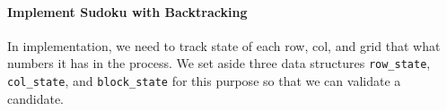 \documentclass[../main.tex]{subfiles}
\begin{document}
\paragraph{Implement Sudoku with Backtracking}

In implementation, we need to track state of each row, col, and grid that what numbers it has in the process. We set aside three data structures \texttt{row\_state}, \texttt{col\_state}, and \texttt{block\_state} for this purpose so that we can validate a candidate. 
\end{document}
